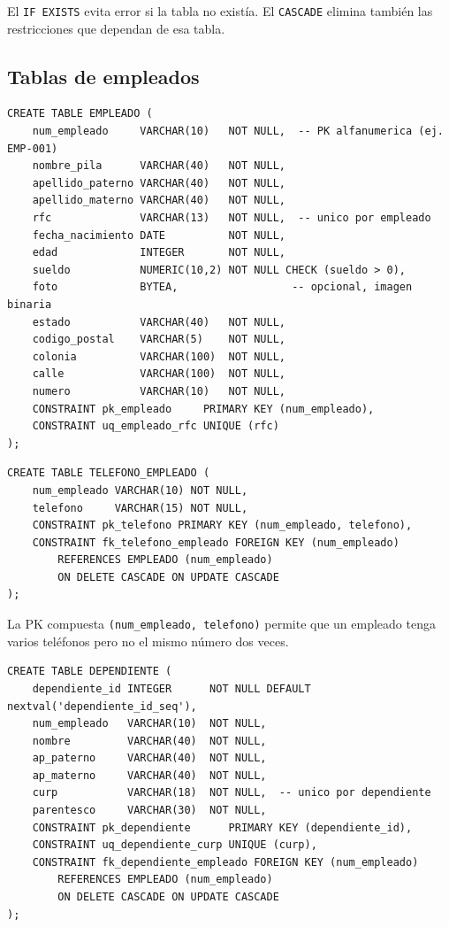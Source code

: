 \documentclass[12pt, a4paper]{article}
\begin{document}
El \texttt{IF EXISTS} evita error si la tabla no exist\'ia. El \texttt{CASCADE} elimina tambi\'en las restricciones que dependan de esa tabla.

\subsection{Tablas de empleados}

\begin{lstlisting}[caption={EMPLEADO --- entidad padre}]
CREATE TABLE EMPLEADO (
    num_empleado     VARCHAR(10)   NOT NULL,  -- PK alfanumerica (ej. EMP-001)
    nombre_pila      VARCHAR(40)   NOT NULL,
    apellido_paterno VARCHAR(40)   NOT NULL,
    apellido_materno VARCHAR(40)   NOT NULL,
    rfc              VARCHAR(13)   NOT NULL,  -- unico por empleado
    fecha_nacimiento DATE          NOT NULL,
    edad             INTEGER       NOT NULL,
    sueldo           NUMERIC(10,2) NOT NULL CHECK (sueldo > 0),
    foto             BYTEA,                  -- opcional, imagen binaria
    estado           VARCHAR(40)   NOT NULL,
    codigo_postal    VARCHAR(5)    NOT NULL,
    colonia          VARCHAR(100)  NOT NULL,
    calle            VARCHAR(100)  NOT NULL,
    numero           VARCHAR(10)   NOT NULL,
    CONSTRAINT pk_empleado     PRIMARY KEY (num_empleado),
    CONSTRAINT uq_empleado_rfc UNIQUE (rfc)
);
\end{lstlisting}

\begin{lstlisting}[caption={TELEFONO\_EMPLEADO --- atributo multivaluado}]
CREATE TABLE TELEFONO_EMPLEADO (
    num_empleado VARCHAR(10) NOT NULL,
    telefono     VARCHAR(15) NOT NULL,
    CONSTRAINT pk_telefono PRIMARY KEY (num_empleado, telefono),
    CONSTRAINT fk_telefono_empleado FOREIGN KEY (num_empleado)
        REFERENCES EMPLEADO (num_empleado)
        ON DELETE CASCADE ON UPDATE CASCADE
);
\end{lstlisting}

La PK compuesta \texttt{(num\_empleado, telefono)} permite que un empleado tenga varios tel\'efonos pero no el mismo n\'umero dos veces.

\begin{lstlisting}[caption={DEPENDIENTE --- familiares del empleado}]
CREATE TABLE DEPENDIENTE (
    dependiente_id INTEGER      NOT NULL DEFAULT nextval('dependiente_id_seq'),
    num_empleado   VARCHAR(10)  NOT NULL,
    nombre         VARCHAR(40)  NOT NULL,
    ap_paterno     VARCHAR(40)  NOT NULL,
    ap_materno     VARCHAR(40)  NOT NULL,
    curp           VARCHAR(18)  NOT NULL,  -- unico por dependiente
    parentesco     VARCHAR(30)  NOT NULL,
    CONSTRAINT pk_dependiente      PRIMARY KEY (dependiente_id),
    CONSTRAINT uq_dependiente_curp UNIQUE (curp),
    CONSTRAINT fk_dependiente_empleado FOREIGN KEY (num_empleado)
        REFERENCES EMPLEADO (num_empleado)
        ON DELETE CASCADE ON UPDATE CASCADE
);
\end{lstlisting}
\end{document}
